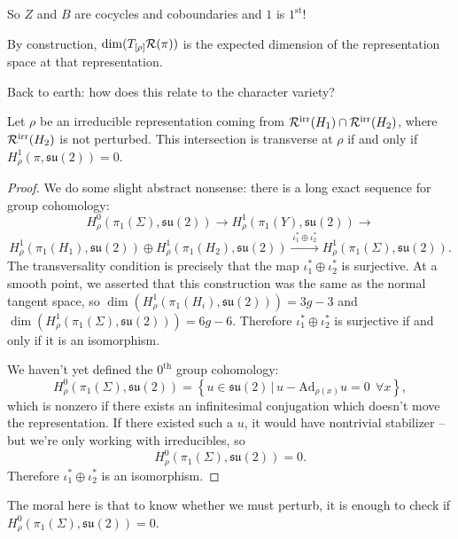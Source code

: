 \documentclass[main]{subfiles}
\begin{document}
\begin{remark}
So $Z$ and $B$ are cocycles and coboundaries and $1$ is $1^{\text{st}}$!
\end{remark}

By construction, $\dim(T_{[\rho]}\mathcal{R}(\pi))$ is the expected dimension of the representation space at that representation.

Back to earth: how does this relate to the character variety?

\begin{lemma}
Let $\rho$ be an irreducible representation coming from $\mathcal{R}^{\mathrm{irr}}(H_1)\cap\mathcal{R}^{\mathrm{irr}}(H_2)$, where $\mathcal{R}^{\mathrm{irr}}(H_2)$ is not perturbed. This intersection is transverse at $\rho$ if and only if $H^1_\rho(\pi,\mathfrak{su}(2))=0$.
\end{lemma}

\begin{proof}
We do some slight abstract nonsense: there is a long exact sequence for group cohomology:
\[
H^0_\rho(\pi_1(\Sigma),\mathfrak{su}(2))\to H^1_\rho(\pi_1(Y),\mathfrak{su}(2))\to
\]
\[
H^1_\rho(\pi_1(H_1),\mathfrak{su}(2))\oplus H^1_\rho(\pi_1(H_2),\mathfrak{su}(2))\xrightarrow{\ \iota_1^\ast\oplus\iota_2^\ast\ }H^1_\rho(\pi_1(\Sigma),\mathfrak{su}(2)).
\]
The transversality condition is precisely that the map $\iota_1^\ast\oplus\iota_2^\ast$ is surjective. At a smooth point, we asserted that this construction was the same as the normal tangent space, so $\dim(H^1_\rho(\pi_1(H_i),\mathfrak{su}(2)))=3g-3$ and $\dim(H^1_\rho(\pi_1(\Sigma),\mathfrak{su}(2)))=6g-6$. Therefore $\iota_1^\ast\oplus\iota_2^\ast$ is surjective if and only if it is an isomorphism.

We haven't yet defined the $0^{\text{th}}$ group cohomology:
\[
H^0_\rho(\pi_1(\Sigma),\mathfrak{su}(2)) = \left\{u\in\mathfrak{su}(2) \,\Big|\, u-\mathrm{Ad}_{\rho(x)}u=0\ \ \forall x\right\},
\]
which is nonzero if there exists an infinitesimal conjugation which doesn't move the representation. If there existed such a $u$, it would have nontrivial stabilizer -- but we're only working with irreducibles, so
\[
H^0_\rho(\pi_1(\Sigma),\mathfrak{su}(2))=0.
\]
Therefore $\iota_1^\ast\oplus\iota_2^\ast$ is an isomorphism. \qedhere
\end{proof}

The moral here is that to know whether we must perturb, it is enough to check if $H^0_\rho(\pi_1(\Sigma),\mathfrak{su}(2))=0$.
\end{document}
